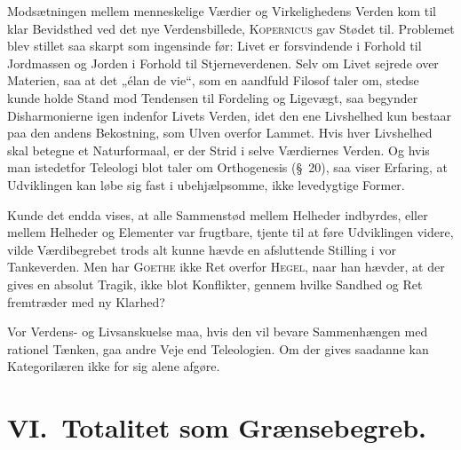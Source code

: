 \documentclass[12pt]{article}
\begin{document}
Modsætningen mellem menneskelige Værdier og Virkelighedens Verden kom til klar
Bevidsthed ved det nye Verdensbillede, \textsc{Kopernicus} gav Stødet til.
Problemet blev stillet saa skarpt som ingensinde før: Livet er forsvindende i
Forhold til Jordmassen og Jorden i Forhold til Stjerneverdenen. Selv om Livet
sejrede over Materien, saa at det „élan de vie“, som en aandfuld Filosof taler
om, stedse kunde holde Stand mod Tendensen til Fordeling og Ligevægt, saa
begynder Disharmonierne igen indenfor Livets Verden, idet den ene Livshelhed kun
bestaar paa den andens Bekostning, som Ulven overfor Lammet. Hvis hver
Livshelhed skal betegne et Naturformaal, er der Strid i selve Værdiernes Verden.
Og hvis man istedetfor Teleologi blot taler om Orthogenesis (§~20), saa viser
Erfaring, at Udviklingen kan løbe sig fast i ubehjælpsomme, ikke levedygtige
Former.

Kunde det endda vises, at alle Sammenstød mellem Helheder indbyrdes, eller
mellem Helheder og Elementer var frugtbare, tjente til at føre Udviklingen
videre, vilde Værdibegrebet trods alt kunne hævde en afsluttende Stilling i vor
Tankeverden. Men har \textsc{Goethe} ikke Ret overfor \textsc{Hegel}, naar han
hævder, at der gives en absolut Tragik, ikke blot Konflikter, gennem hvilke
Sandhed og Ret fremtræder med ny Klarhed?

Vor Verdens- og Livsanskuelse maa, hvis den vil bevare Sammenhængen med rationel
Tænken, gaa andre Veje end Teleologien. Om der gives saadanne kan Kategorilæren
ikke for sig alene afgøre.

\section*{VI.\ Totalitet som Grænsebegreb.}
\end{document}
